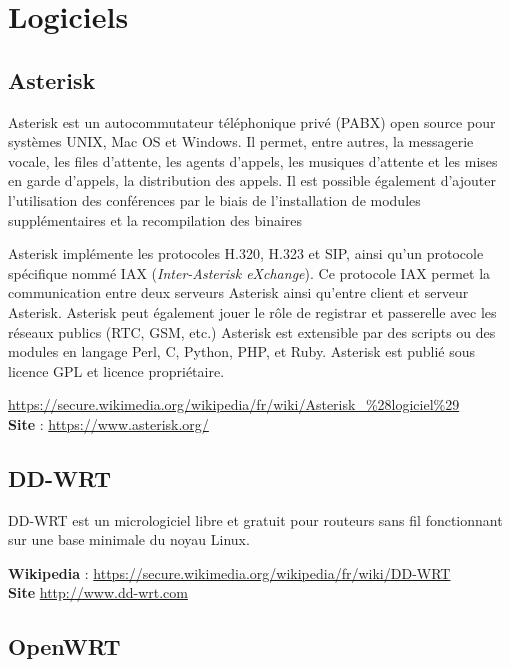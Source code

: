 \documentclass[a4paper,french,11pt,twoside]{article}
\begin{document}

\section{Logiciels} \label{logiciels}
\subsection{Asterisk} \label{asterisk}

Asterisk est un autocommutateur téléphonique privé (PABX) open source pour systèmes UNIX, Mac OS et Windows. Il permet, entre autres, la messagerie vocale, les files d'attente, les agents d'appels, les musiques d'attente et les mises en garde d'appels, la distribution des appels. Il est possible également d'ajouter l'utilisation des conférences par le biais de l'installation de modules supplémentaires et la recompilation des binaires

\medskip
Asterisk implémente les protocoles H.320, H.323 et SIP, ainsi qu'un protocole spécifique nommé IAX (\textit{Inter-Asterisk eXchange}). Ce protocole IAX permet la communication entre deux serveurs Asterisk ainsi qu'entre client et serveur Asterisk. Asterisk peut également jouer le rôle de registrar et passerelle avec les réseaux publics (RTC, GSM, etc.) Asterisk est extensible par des scripts ou des modules en langage Perl, C, Python, PHP, et Ruby. Asterisk est publié sous licence GPL et licence propriétaire.

\medskip
\noindent \url{https://secure.wikimedia.org/wikipedia/fr/wiki/Asterisk\_\%28logiciel\%29}\\
\noindent \textbf{Site} : \url{https://www.asterisk.org/}

\subsection{DD-WRT} \label{ddwrt}

DD-WRT est un micrologiciel libre et gratuit pour routeurs sans fil fonctionnant sur une base minimale du noyau Linux.

\medskip
\noindent \textbf{Wikipedia} : \url{https://secure.wikimedia.org/wikipedia/fr/wiki/DD-WRT}\\
\noindent \textbf{Site} \url{http://www.dd-wrt.com}


\subsection{OpenWRT} \label{openwrt}
\end{document}
